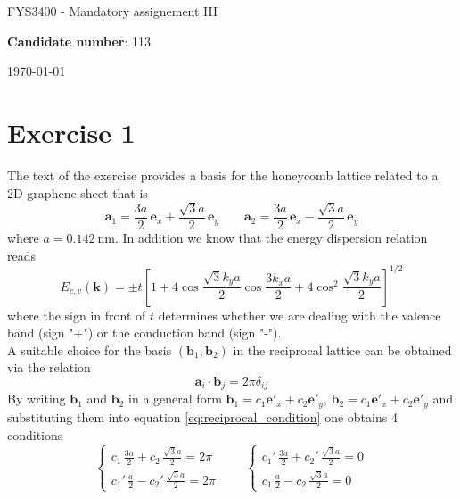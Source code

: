 \documentclass{article}
\newcommand{\ve}[1]{\mathbf{#1}}
\begin{document}
\begin{center}
    \centerline{\LARGE FYS3400 - Mandatory assignement III}
    \vspace{10pt}
    \centerline{\large\textbf{Candidate number}: 113}
    \vspace{10pt}
    \centerline{\today}
\end{center}

\section*{Exercise 1}
The text of the exercise provides a basis for the honeycomb lattice related to a 2D graphene sheet that is 
\begin{equation*}
    \ve a_1 = \frac{3a}{2} \, \ve e_x + \frac{\sqrt{3}a}{2} \, \ve e_y \qquad
    \ve a_2 = \frac{3a}{2} \, \ve e_x - \frac{\sqrt{3}a}{2} \, \ve e_y
\end{equation*}
where $a = \SI{0.142}{\nano\meter}$. In addition we know that the energy dispersion relation reads 
\begin{equation*}
    E_{c, v}(\mathbf{k})=\pm t\left[1+4 \cos \frac{\sqrt{3} k_y a}{2} \cos \frac{3 k_xa}{2}+4 \cos ^{2} \frac{\sqrt{3} k_y a}{2}\right]^{1 / 2}
\end{equation*}
where the sign in front of $t$ determines whether we are dealing with the valence band (sign "+") or the conduction band (sign "-"). \\
A suitable choice for the basis $(\ve b_1, \ve b_2)$ in the reciprocal lattice can be obtained via the relation
\begin{equation}
    \ve a_i \cdot \ve b_j = 2\pi \delta_{ij}
    \label{eq:reciprocal_condition}
\end{equation}
By writing $\ve b_1$ and $\ve b_2$ in a general form $\ve b_1 = c_1 \ve e'_x + c_2 \ve e'_y$, $\ve b_2 = c_1 \ve e'_x + c_2 \ve e'_y$ and substituting them into equation \ref{eq:reciprocal_condition} one obtains 4 conditions
\begin{equation*}
    \begin{cases}
        c_1 \, \frac{3a}{2} + c_2 \, \frac{\sqrt{3}a}{2} = 2\pi \\
        c_1' \, \frac{a}{2} - c_2' \, \frac{\sqrt{3}a}{2} = 2\pi
    \end{cases}
    \qquad
    \begin{cases}
        c_1' \, \frac{3a}{2} + c_2' \, \frac{\sqrt{3}a}{2} = 0 \\
        c_1 \, \frac{a}{2} - c_2 \, \frac{\sqrt{3}a}{2} = 0
    \end{cases}
\end{equation*}
\end{document}
